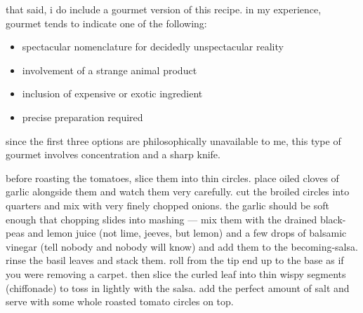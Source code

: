 that said, i do include a gourmet version of this recipe. in my
experience, gourmet tends to indicate one of the following:

\begin{itemize}
  \item spectacular nomenclature for decidedly unspectacular reality
  \item involvement of a strange animal product
  \item inclusion of expensive or exotic ingredient
  \item precise preparation required
\end{itemize}

since the first three options are philosophically unavailable to me,
this type of gourmet involves concentration and a sharp knife.

before roasting the tomatoes, slice them into thin circles. place
oiled cloves of garlic alongside them and watch them very
carefully. cut the broiled circles into quarters and mix with very
finely chopped onions. the garlic should be soft enough that chopping
slides into mashing --- mix them with the drained black-peas and lemon
juice (not lime, jeeves, but lemon) and a few drops of balsamic
vinegar (tell nobody and nobody will know) and add them to the
becoming-salsa. rinse the basil leaves and stack them. roll from the
tip end up to the base as if you were removing a carpet. then slice
the curled leaf into thin wispy segments (chiffonade) to toss in
lightly with the salsa. add the perfect amount of salt and serve with
some whole roasted tomato circles on top.
